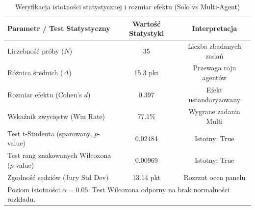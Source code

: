 \begin{table}[htbp]
\centering
\caption{Weryfikacja istotności statystycznej i rozmiar efektu (Solo vs Multi-Agent)}
\label{tab:statystyka_istotnosci}
\begin{tabular}{lcc}
\hline
\textbf{Parametr / Test Statystyczny} & \textbf{Wartość Statystyki} & \textbf{Interpretacja} \\
\hline
Liczebność próby ($N$) & 35 & Liczba zbadanych zadań \\
Różnica średnich ($\Delta$) & 15.3 pkt & Przewaga roju agentów \\
Rozmiar efektu (Cohen's $d$) & 0.397 & Efekt ustandaryzowany \\
Wskaźnik zwycięstw (Win Rate) & 77.1\% & Wygrane zadania Multi \\
Test t-Studenta (sparowany, $p$-value) & 0.02484 & Istotny: True \\
Test rang znakowanych Wilcoxona ($p$-value) & 0.00969 & Istotny: True \\
Zgodność sędziów (Jury Std Dev) & 13.14 pkt & Rozrzut ocen panelu \\
\hline
\multicolumn{3}{l}{\footnotesize * Poziom istotności $\alpha = 0.05$. Test Wilcoxona odporny na brak normalności rozkładu.} \\
\hline
\end{tabular}
\end{table}
